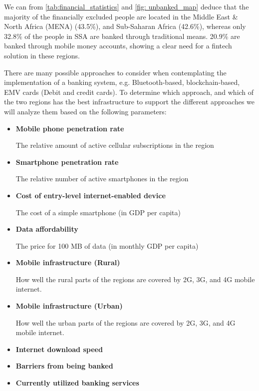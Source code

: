 \documentclass[11pt, a4paper]{article}
\begin{document}
We can from \autoref{tab:financial_statistics} and \autoref{fig: unbanked_map} deduce that the majority of the financially excluded people are located in the Middle East \& North Africa (MENA) (43.5\%), and Sub-Saharan Africa (42.6\%), whereas only 32.8\% of the people in SSA are banked through traditional means. 20.9\% are banked through mobile money accounts, showing a clear need for a fintech solution in these regions.

There are many possible approaches to consider when contemplating the implementation of a banking system, e.g. Bluetooth-based, blockchain-based, EMV cards (Debit and credit cards). To determine which approach, and which of the two regions has the best infrastructure to support the different approaches we will analyze them based on the following parameters:
\begin{itemize}
   \item \textbf{Mobile phone penetration rate}

   The relative amount of active cellular subscriptions in the region
   \item \textbf{Smartphone penetration rate}

   The relative number of active smartphones in the region
   \item \textbf{Cost of entry-level internet-enabled device}

   The cost of a simple smartphone (in GDP per capita)

   \item \textbf{Data affordability}

   The price for 100 MB of data (in monthly GDP per capita)

   \item \textbf{Mobile infrastructure (Rural)}

   How well the rural parts of the regions are covered by 2G, 3G, and 4G mobile internet.

   \item \textbf{Mobile infrastructure (Urban)}

   How well the urban parts of the regions are covered by 2G, 3G, and 4G mobile internet.

   \item \textbf{Internet download speed}

   \item \textbf{Barriers from being banked}

   \item \textbf{Currently utilized banking services}
 \end{itemize}
\end{document}
